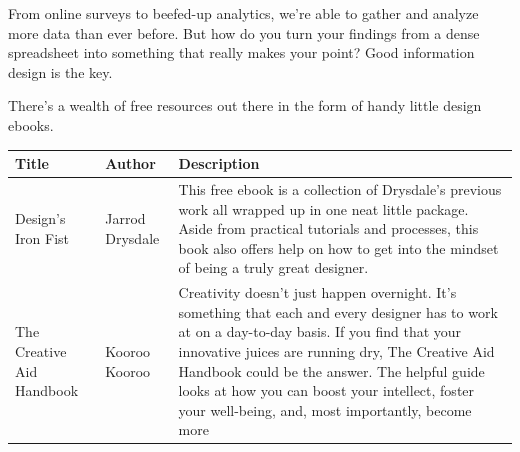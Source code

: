 \documentclass[]{book}
\theoremstyle{definition}
\theoremstyle{definition}
\theoremstyle{definition}
\theoremstyle{remark}
\begin{document}
From online surveys to beefed-up analytics, we're able to gather and
analyze more data than ever before. But how do you turn your findings
from a dense spreadsheet into something that really makes your point?
Good information design is the key.

There's a wealth of free resources out there in the form of handy little
design ebooks.

\begin{longtable}[]{@{}lll@{}}
\toprule
\begin{minipage}[b]{0.08\columnwidth}\raggedright\strut
\textbf{Title}\strut
\end{minipage} & \begin{minipage}[b]{0.11\columnwidth}\raggedright\strut
\textbf{Author}\strut
\end{minipage} & \begin{minipage}[b]{0.72\columnwidth}\raggedright\strut
\textbf{Description}\strut
\end{minipage}\tabularnewline
\midrule
\endhead
\begin{minipage}[t]{0.08\columnwidth}\raggedright\strut
Design's Iron Fist\strut
\end{minipage} & \begin{minipage}[t]{0.11\columnwidth}\raggedright\strut
Jarrod Drysdale\strut
\end{minipage} & \begin{minipage}[t]{0.72\columnwidth}\raggedright\strut
This free ebook is a collection of Drysdale's previous work all wrapped
up in one neat little package. Aside from practical tutorials and
processes, this book also offers help on how to get into the mindset of
being a truly great designer.\strut
\end{minipage}\tabularnewline
\begin{minipage}[t]{0.08\columnwidth}\raggedright\strut
The Creative Aid Handbook\strut
\end{minipage} & \begin{minipage}[t]{0.11\columnwidth}\raggedright\strut
Kooroo Kooroo\strut
\end{minipage} & \begin{minipage}[t]{0.72\columnwidth}\raggedright\strut
Creativity doesn't just happen overnight. It's something that each and
every designer has to work at on a day-to-day basis. If you find that
your innovative juices are running dry, The Creative Aid Handbook could
be the answer. The helpful guide looks at how you can boost your
intellect, foster your well-being, and, most importantly, become more

\end{minipage}
\end{longtable}
\end{document}
